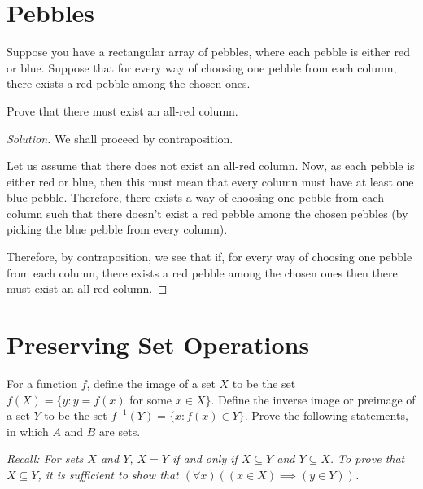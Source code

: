 \documentclass[openany]{book}
\newenvironment{solution}{\begin{proof}[Solution]}{\end{proof}}
\begin{document}
\section{Pebbles}
\begin{hw}
	Suppose you have a rectangular array of pebbles, where each pebble is either red or blue. Suppose that for every way of choosing one pebble from each column, there exists a red pebble among the chosen ones.
	
	Prove that there must exist an all-red column.
\end{hw}
\begin{solution}
	We shall proceed by contraposition.
	
	Let us assume that there does not exist an all-red column. Now, as each pebble is either red or blue, then this must mean that every column must have at least one blue pebble. Therefore, there exists a way of choosing one pebble from each column such that there doesn't exist a red pebble among the chosen pebbles (by picking the blue pebble from every column).
	
	Therefore, by contraposition, we see that if, for every way of choosing one pebble from each column, there exists a red pebble among the chosen ones then there must exist an all-red column.
\end{solution}

\section{Preserving Set Operations}
For a function $f$, define the image of a set $X$ to be the set $f(X) = \{y : y = f(x)$ for some $x\in X\}$. Define the inverse image or preimage of a set $Y$ to be the set $f^{-1}(Y) = \{x : f(x) \in Y\}.$ Prove the following statements, in which $A$ and $B$ are sets.

\textit{Recall: For sets $X$ and $Y$, $X = Y$ if and only if $X \subseteq Y$ and $Y \subseteq X$. To prove that $X \subseteq Y$, it is sufficient to show that $(\forall x)((x \in X) \implies (y \in Y))$.}
\end{document}
